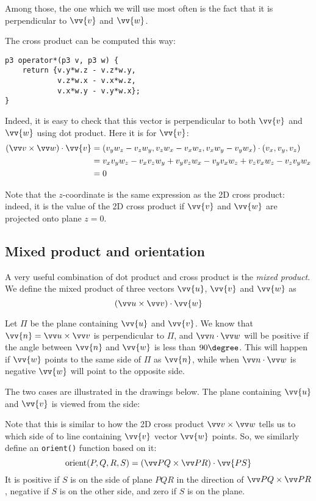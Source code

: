 Among those, the one which we will use most often is the fact that it is perpendicular to $\vv{v}$ and $\vv{w}$.

The cross product can be computed this way:
\begin{lstlisting}
p3 operator*(p3 v, p3 w) {
    return {v.y*w.z - v.z*w.y,
            v.z*w.x - v.x*w.z,
            v.x*w.y - v.y*w.x};
}
\end{lstlisting}
Indeed, it is easy to check that this vector is perpendicular to both $\vv{v}$ and $\vv{w}$ using dot product. Here it is for $\vv{v}$:
\begin{align*}
(\crossv{v}{w})\cdot \vv{v}
&= (v_yw_z - v_zw_y, v_zw_x - v_xw_z, v_xw_y - v_yw_x) \cdot (v_x,v_y,v_z) \\
&= v_xv_yw_z - v_xv_zw_y + v_yv_zw_x - v_yv_xw_z + v_zv_xw_z - v_zv_yw_x \\
&= 0
\end{align*}

Note that the $z$-coordinate is the same expression as the 2D cross product: indeed, it is the value of the 2D cross product if $\vv{v}$ and $\vv{w}$ are projected onto plane $z=0$.

\subsection{Mixed product and orientation}\label{ss:mixed-orient}
A very useful combination of dot product and cross product is the \emph{mixed product}. We define the mixed product of three vectors $\vv{u}$, $\vv{v}$ and $\vv{w}$ as
\[(\crossv{u}{v})\cdot\vv{w}\]

Let $\Pi$ be the plane containing $\vv{u}$ and $\vv{v}$. We know that $\vv{n}=\crossv{u}{v}$ is perpendicular to $\Pi$, and $\dotv{n}{w}$ will be positive if the angle between $\vv{n}$ and $\vv{w}$ is less than $90\degree$. This will happen if $\vv{w}$ points to the same side of $\Pi$ as $\vv{n}$, while when $\dotv{n}{w}$ is negative $\vv{w}$ will point to the opposite side.

The two cases are illustrated in the drawings below. The plane containing $\vv{u}$ and $\vv{v}$ is viewed from the side:

Note that this is similar to how the 2D cross product $\crossv{v}{w}$ tells us to which side of to line containing $\vv{v}$ vector $\vv{w}$ points. So, we similarly define an \lstinline|orient()| function based on it:
\[\orient(P,Q,R,S) = \left(\crossv{PQ}{PR}\right)\cdot\vv{PS}\]
It is positive if $S$ is on the side of plane $PQR$ in the direction of $\crossv{PQ}{PR}$, negative if $S$ is on the other side, and zero if $S$ is on the plane.

